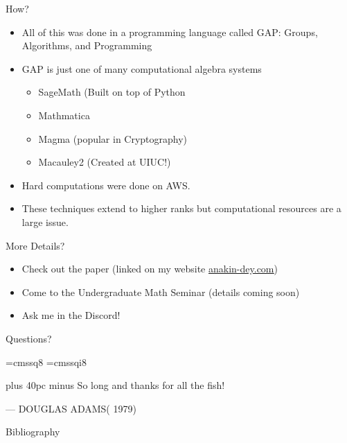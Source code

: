 \documentclass[aspectratio=169]{beamer}
\begin{document}
\begin{frame}{How?}
    \begin{itemize}
        \item All of this was done in a programming language called \textcolor{sigma@mainblue}{\textsc{GAP}}: Groups, Algorithms, and Programming \pause
        \item \textsc{GAP} is just one of many computational algebra systems
        \begin{itemize}
            \item SageMath (Built on top of Python
            \item Mathmatica
            \item Magma (popular in Cryptography)
            \item Macauley2 (Created at UIUC!)
        \end{itemize} \pause
        \item Hard computations were done on AWS.
        \item These techniques extend to higher ranks but computational resources are a large issue.
    \end{itemize}
\end{frame}

\begin{frame}{More Details?}
    \begin{itemize}
        \item Check out the paper (linked on my website \href{https://www.anakin-dey.com/}{\ul{anakin-dey.com}})
        \item Come to the Undergraduate Math Seminar (details coming soon)
        \item Ask me in the Discord!
    \end{itemize}
\end{frame}

\begin{frame}{}
      \begin{center}
    {\color{sigma@mainblue} \LARGE Questions?}
  \end{center}
\end{frame}

\font\eightss=cmssq8
\font\eightssi=cmssqi8
\newcommand\quoteAuthorDate[3]{\begingroup
  \baselineskip 10pt
  \parfillskip 0pt
  \interlinepenalty 10000 %
  \leftskip 0pt plus 40pc minus \parindent
  \let\rm=\eightss
  \let\sl=\eightssi
  \everypar{\sl}#1\par
  \nobreak\smallskip
  \noindent\rm--- #2\unskip\enspace(#3)\par
  \endgroup}
\begin{frame}
    \begin{center}
        \item \quoteAuthorDate{So long and thanks for all the fish!}{DOUGLAS ADAMS}{\color{sigma@mainblue} 1979}
    \end{center}
\end{frame}

\begin{frame}{Bibliography}
    
    
\end{frame}
\end{document}

